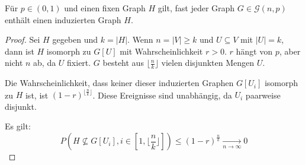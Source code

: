 \begin{proposition}
    Für $ p \in (0, 1) $ und einen fixen Graph $ H $ gilt, fast jeder Graph $ G \in \mathcal{G}(n, p) $ enthält einen induzierten Graph $ H $.
\end{proposition}

\begin{proof}
    Sei $ H $ gegeben und $ k = |H| $.
    Wenn $ n = |V| \geq k $ und $ U \subseteq V $ mit $ |U| = k $, dann ist $ H $ isomorph zu $ G[U] $ mit Wahrscheinlichkeit $ r > 0 $.
    $ r $ hängt von $ p $, aber nicht $ n $ ab, da $ U $ fixiert.
    $ G $ besteht aus $ \lfloor \frac{n}{k} \rfloor $ vielen disjunkten Mengen $ U $.

    Die Wahrscheinlichkeit, dass keiner dieser induzierten Graphen $ G[U_i] $ isomorph zu $ H $ ist, ist $ (1 - r)^{\lfloor \frac{n}{k} \rfloor} $.
    Diese Ereignisse sind unabhängig, da $ U_i $ paarweise disjunkt.

    Es gilt:
    \begin{equation*}
        P(H \not \subseteq G[U_i], i \in [1, \lfloor \frac{n}{k} \rfloor]) \leq (1 - r)^{\frac{n}{k}} \xrightarrow[n \to \infty]{} 0
    \end{equation*}
\end{proof}
